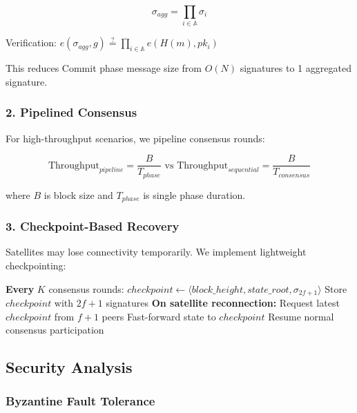 \begin{equation}
\sigma_{agg} = \prod_{i \in \mathbb{A}} \sigma_i
\end{equation}

Verification: $e(\sigma_{agg}, g) \stackrel{?}{=} \prod_{i \in \mathbb{A}} e(H(m), pk_i)$

This reduces Commit phase message size from $O(N)$ signatures to 1 aggregated signature.

\subsubsection{2. Pipelined Consensus}

For high-throughput scenarios, we pipeline consensus rounds:

\begin{equation}
\text{Throughput}_{pipeline} = \frac{B}{T_{phase}} \text{ vs } \text{Throughput}_{sequential} = \frac{B}{T_{consensus}}
\end{equation}

where $B$ is block size and $T_{phase}$ is single phase duration.

\subsubsection{3. Checkpoint-Based Recovery}

Satellites may lose connectivity temporarily. We implement lightweight checkpointing:

\begin{algorithm}[H] \small
\caption{Checkpoint and Recovery Protocol}
\begin{algorithmic}[1]
\State \textbf{Every} $K$ consensus rounds:
    \State $checkpoint \leftarrow \langle block\_height, state\_root, \sigma_{2f+1} \rangle$
    \State Store $checkpoint$ with $2f+1$ signatures
\State
\State \textbf{On satellite reconnection:}
    \State Request latest $checkpoint$ from $f+1$ peers
    \State Fast-forward state to $checkpoint$
    \State Resume normal consensus participation
\end{algorithmic}
\end{algorithm}


\subsection{Security Analysis}

\subsubsection{Byzantine Fault Tolerance}

